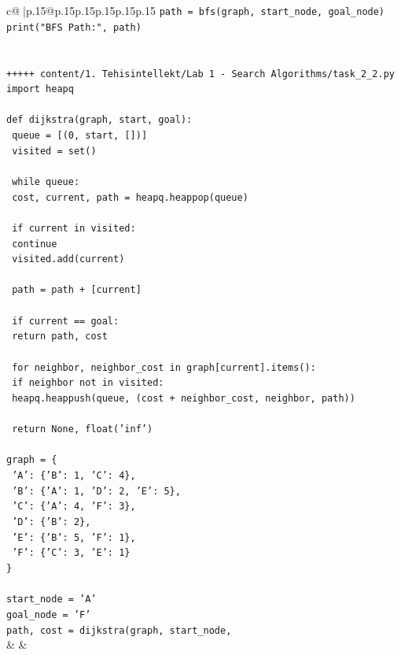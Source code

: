 \documentclass{article}
\begin{document}
{\begin{supertabular}{c@{$\;$}|p{.15\linewidth}@{}p{.15\linewidth}p{.15\linewidth}p{.15\linewidth}p{.15\linewidth}p{.15\linewidth}}
{{{\texttt{path = bfs(graph, start\_node, goal\_node)} \\
\texttt{print("BFS Path:", path)} \\
\\ 
\\ 
\texttt{+++++ content/1. Tehisintellekt/Lab 1 {-} Search Algorithms/task\_2\_2.py} \\
\texttt{import heapq} \\
\\ 
\texttt{def dijkstra(graph, start, goal):} \\
\texttt{    queue = {[}(0, start, {[}{]}){]}} \\
\texttt{    visited = set()} \\
\\ 
\texttt{    while queue:} \\
\texttt{        cost, current, path = heapq.heappop(queue)} \\
\\ 
\texttt{        if current in visited:} \\
\texttt{            continue} \\
\texttt{        visited.add(current)} \\
\\ 
\texttt{        path = path + {[}current{]}} \\
\\ 
\texttt{        if current == goal:} \\
\texttt{            return path, cost} \\
\\ 
\texttt{        for neighbor, neighbor\_cost in graph{[}current{]}.items():} \\
\texttt{            if neighbor not in visited:} \\
\texttt{                heapq.heappush(queue, (cost + neighbor\_cost, neighbor, path))} \\
\\ 
\texttt{    return None, float('inf')} \\
\\ 
\texttt{graph = \{} \\
\texttt{    'A': \{'B': 1, 'C': 4\},} \\
\texttt{    'B': \{'A': 1, 'D': 2, 'E': 5\},} \\
\texttt{    'C': \{'A': 4, 'F': 3\},} \\
\texttt{    'D': \{'B': 2\},} \\
\texttt{    'E': \{'B': 5, 'F': 1\},} \\
\texttt{    'F': \{'C': 3, 'E': 1\}} \\
\texttt{\}} \\
\\ 
\texttt{start\_node = 'A'} \\
\texttt{goal\_node = 'F'} \\
\texttt{path, cost = dijkstra(graph, start\_node,} \\
            }
        }
    }
    & & \\ \\


\end{supertabular}}
\end{document}
